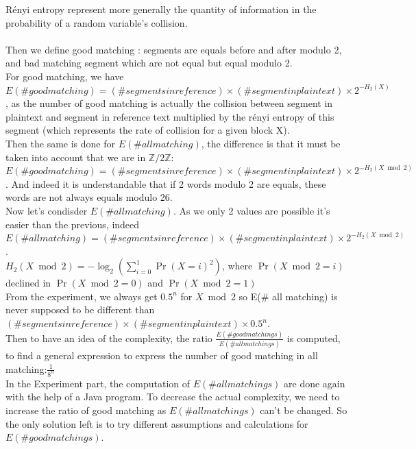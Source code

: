 \documentclass{article}
\begin{document}
R\'enyi entropy represent more generally the quantity of information in the probability of a random variable's collision.\\
\\
Then we define good matching : segments are equals before and after modulo 2, and bad matching segment which are not equal but equal modulo 2.\\
${}$\hspace{1em}For good matching, we have $E(\# good matching) = (\# segments in reference) \times (\#segment in plaintext) \times 2^{-H_{2}(X)}$, as the number of good matching is actually the collision between segment in plaintext and segment in reference text multiplied by the r\'enyi entropy of this segment (which represents the rate of collision for a given block X).\\
Then the same is done for  $E(\# all matching)$, the difference is that it must be taken into account that we are in $\mathbb{Z}/2\mathbb{Z}$:$E(\# good matching) = (\# segments in reference) \times (\#segment in plaintext) \times 2^{-H_{2}(X \bmod 2)}$ . And indeed it is understandable that if 2 words modulo 2 are equals, these words are not always equals modulo 26.\\
${}$\hspace{1em}Now let's condisder $E(\# all matching)$. As we only 2 values are possible it's easier than the previous, indeed $E(\# all matching) =(\# segments in reference) \times (\#segment in plaintext) \times 2^{-H_{2}(X \bmod 2)}$.\\
$H_{2}(X \bmod 2) = -\log_2(\sum_{i=0}^{1}{\Pr(X=i)^2})$, where $\Pr(X \bmod 2=i)$ declined in $\Pr(X \bmod 2=0)$ and $\Pr(X \bmod 2 =1)$\\
From the experiment, we always get $0.5^n$ for $X \bmod 2$ so E(\# all matching) is never supposed to be different than $(\# segments in reference) \times (\#segment in plaintext) \times 0.5^n$.\\
Then to have an idea of the complexity, the ratio $\frac{E(\# good matchings)}{E(\# all matchings)}$ is computed, to find a general expression to express the number of good matching in all matching:$\frac{1}{8^n}$\\
In the Experiment part, the computation of $E(\# all matchings)$ are done again with the help of a Java program.
To decrease the actual complexity, we need to increase the ratio of good matching as $E(\# all matchings)$ can't be changed. So the only solution left is to try different assumptions and calculations for $E(\# good matchings)$.\\
\end{document}
